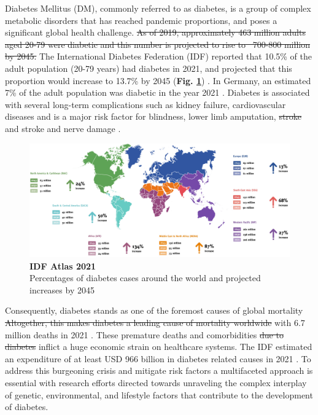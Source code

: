 Diabetes Mellitus (DM), commonly referred to as diabetes, is a group of complex metabolic disorders that has reached pandemic proportions, and poses a significant global health challenge. \st{As of 2019, approximately 463 million adults aged 20-79 were diabetic and this number is projected to rise to ~700-800 million by 2045.} The International Diabetes Federation (IDF) reported that 10.5\% of the adult population (20-79 years) had diabetes in 2021, and projected that this proportion would increase to 13.7\% by 2045 (\textbf{Fig. \ref{fig:idf}}) \textbf{\cite{home_idf_nodate}}. In Germany, an estimated 7\% of the adult population was diabetic in the year 2021 \textbf{\cite{noauthor_germany_nodate}}. Diabetes is associated with several long-term complications such as kidney failure, cardiovascular diseases and is a major risk factor for blindness, lower limb amputation, \st{stroke} and stroke and nerve damage \textbf{\cite{ashcroft_diabetes_2012,emerging_risk_factors_collaboration_diabetes_2010,leon_diabetes_2015}}. 

\begin{figure}[H]
\centering
\includegraphics[width=15cm]{Chapter1/Fig/F1-3-01.png}
\caption[fig:idf]{\textbf{IDF Atlas 2021}\\Percentages of diabetes cases around the world and projected increases by 2045}
\label{fig:idf}
\end{figure}


Consequently, diabetes stands as one of the foremost causes of global mortality \st{Altogether, this makes diabetes a leading cause of mortality worldwide} with 6.7 million deaths in 2021 \textbf{\cite{home_idf_nodate}}. These premature deaths and comorbidities \st{due to diabetes} inflict a huge economic strain on healthcare systems. The IDF estimated an expenditure of at least USD 966 billion in diabetes related causes in 2021 \textbf{\cite{home_idf_nodate}}. To address this burgeoning crisis and mitigate risk factors a multifaceted approach is essential with research efforts directed towards unraveling the complex interplay of genetic, environmental, and lifestyle factors that contribute to the development of diabetes. 



